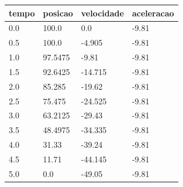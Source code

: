 \begin{tabular}{llll}
\toprule
tempo & posicao & velocidade & aceleracao \\
\midrule
0.0 & 100.0 & 0.0 & -9.81 \\
0.5 & 100.0 & -4.905 & -9.81 \\
1.0 & 97.5475 & -9.81 & -9.81 \\
1.5 & 92.6425 & -14.715 & -9.81 \\
2.0 & 85.285 & -19.62 & -9.81 \\
2.5 & 75.475 & -24.525 & -9.81 \\
3.0 & 63.2125 & -29.43 & -9.81 \\
3.5 & 48.4975 & -34.335 & -9.81 \\
4.0 & 31.33 & -39.24 & -9.81 \\
4.5 & 11.71 & -44.145 & -9.81 \\
5.0 & 0.0 & -49.05 & -9.81 \\
\bottomrule
\end{tabular}
